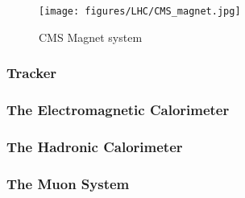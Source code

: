 \begin{figure}[!htbp]
	\centering
	\texttt{[image: figures/LHC/CMS\_magnet.jpg]}
	\caption{CMS Magnet system}
	\label{fig:CMS-magnet}
\end{figure}

\subsubsection{Tracker} %
\label{ssub:tracker}

\subsubsection{The Electromagnetic Calorimeter} %
\label{sub:the_electromagnetic_calorimeter}

\subsubsection{The Hadronic Calorimeter} %
\label{sub:the_hadronic_calorimeter}

\subsubsection{The Muon System} %
\label{sub:the_muon_system}





